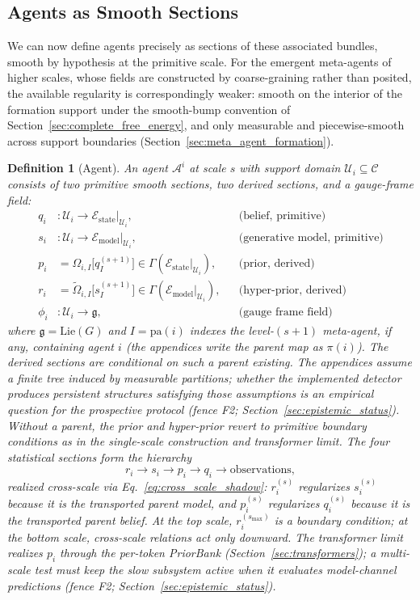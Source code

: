 \documentclass[11pt]{article}
\newtheorem{definition}{Definition}
\begin{document}
\subsection{Agents as Smooth Sections}
\label{sec:agent_definition}

We can now define agents precisely as sections of these associated bundles, smooth by hypothesis at the primitive scale. For the emergent meta-agents of higher scales, whose fields are constructed by coarse-graining rather than posited, the available regularity is correspondingly weaker: smooth on the interior of the formation support under the smooth-bump convention of Section~\ref{sec:complete_free_energy}, and only measurable and piecewise-smooth across support boundaries (Section~\ref{sec:meta_agent_formation}).

\begin{definition}[Agent]
An agent $\mathcal{A}^i$ at scale $s$ with support domain $\mathcal{U}_i \subseteq \mathcal{C}$ consists of two primitive smooth sections, two derived sections, and a gauge-frame field:
\begin{align}
q_i &: \mathcal{U}_i \to \mathcal{E}_{\mathrm{state}}|_{\mathcal{U}_i}, &&\text{(belief, primitive)} \\
s_i &: \mathcal{U}_i \to \mathcal{E}_{\mathrm{model}}|_{\mathcal{U}_i}, &&\text{(generative model, primitive)} \\
p_i &= \Omega_{i,I}\big[q_I^{(s+1)}\big] \in \Gamma\left(\mathcal{E}_{\mathrm{state}}|_{\mathcal{U}_i}\right), &&\text{(prior, derived)} \\
r_i &= \tilde\Omega_{i,I}\big[s_I^{(s+1)}\big] \in \Gamma\left(\mathcal{E}_{\mathrm{model}}|_{\mathcal{U}_i}\right), &&\text{(hyper-prior, derived)} \\
\phi_i &: \mathcal{U}_i \to \mathfrak{g}, &&\text{(gauge frame field)}
\end{align}
where $\mathfrak{g}=\mathrm{Lie}(G)$ and $I=\mathrm{pa}(i)$ indexes the level-$(s+1)$ meta-agent, if any, containing agent $i$ (the appendices write the parent map as $\pi(i)$). The derived sections are conditional on such a parent existing. The appendices assume a finite tree induced by measurable partitions; whether the implemented detector produces persistent structures satisfying those assumptions is an empirical question for the prospective protocol (fence F2; Section~\ref{sec:epistemic_status}). Without a parent, the prior and hyper-prior revert to primitive boundary conditions as in the single-scale construction and transformer limit. The four statistical sections form the hierarchy
\[
r_i \to s_i \to p_i \to q_i \to \text{observations},
\]
realized cross-scale via Eq.~\eqref{eq:cross_scale_shadow}: $r_i^{(s)}$ regularizes $s_i^{(s)}$ because it is the transported parent model, and $p_i^{(s)}$ regularizes $q_i^{(s)}$ because it is the transported parent belief. At the top scale, $r_i^{(s_{\max})}$ is a boundary condition; at the bottom scale, cross-scale relations act only downward. The transformer limit realizes $p_i$ through the per-token PriorBank (Section~\ref{sec:transformers}); a multi-scale test must keep the slow subsystem active when it evaluates model-channel predictions (fence F2; Section~\ref{sec:epistemic_status}).
\end{definition}
\end{document}
